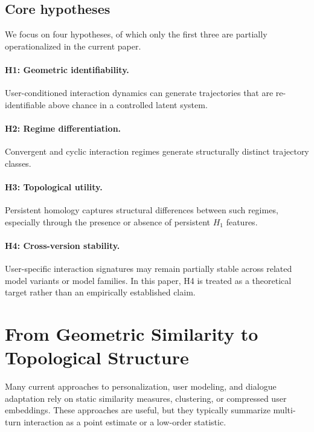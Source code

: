 \documentclass[11pt]{article}
\begin{document}
\subsection{Core hypotheses}

We focus on four hypotheses, of which only the first three
are partially operationalized in the current paper.

\paragraph{H1: Geometric identifiability.}
User-conditioned interaction dynamics can generate
trajectories that are re-identifiable above chance in a
controlled latent system.

\paragraph{H2: Regime differentiation.}
Convergent and cyclic interaction regimes generate
structurally distinct trajectory classes.

\paragraph{H3: Topological utility.}
Persistent homology captures structural differences between
such regimes, especially through the presence or absence of
persistent $H_1$ features.

\paragraph{H4: Cross-version stability.}
User-specific interaction signatures may remain partially
stable across related model variants or model families. In
this paper, H4 is treated as a theoretical target rather than
an empirically established claim.


\section{From Geometric Similarity to Topological Structure}

Many current approaches to personalization, user modeling,
and dialogue adaptation rely on static similarity measures,
clustering, or compressed user embeddings. These approaches
are useful, but they typically summarize multi-turn
interaction as a point estimate or a low-order statistic.
\end{document}
